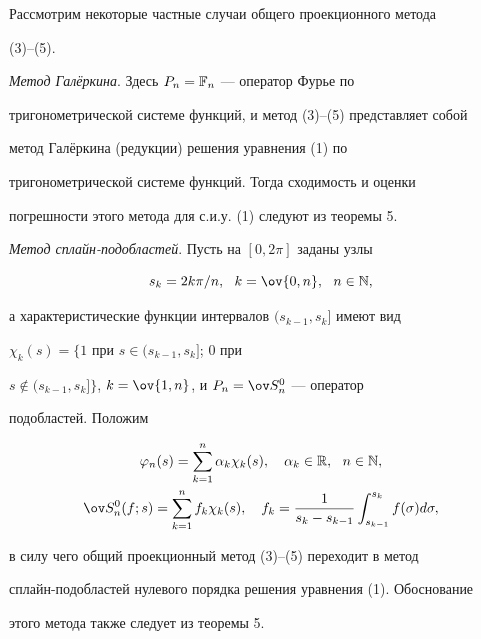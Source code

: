 Рассмотрим некоторые частные случаи общего проекционного метода 


(3)--(5).





{\it Метод Гал\"еркина}. Здесь $P_n=\Bbb F_n$ --- оператор Фурье по 


тригонометрической системе функций, и метод (3)--(5) представляет собой 


метод Гал\"еркина (редукции) решения уравнения (1) по 


тригонометрической системе функций. Тогда сходимость и оценки 


погрешности этого метода для с.и.у. (1) следуют из теоремы 5.





{\it Метод сплайн-подобластей}. Пусть на $[0,2\pi]$ заданы узлы


$$


s_k=2k\pi/n,\ \ k=\ov{0,n},\ \ n\in\Bbb N,


$$


а характеристические функции интервалов $(s_{k-1},s_k]$ имеют вид 


$\chi_k(s)=\{1$ при $s\in(s_{k-1},s_k]$; $0$ при 


$s\notin(s_{k-1},s_k]\}$, $k=\ov{1,n}$, и $P_n=\ov S^0_n$ --- оператор 


подобластей. Положим


\begin{gather*}


\varphi_n(s)=\sum^n_{k=1}\alpha_k\chi_k(s),\quad


\alpha_k\in\Bbb R,\ \ n\in\Bbb N, \\


\ov S^0_n(f;s)=\sum^n_{k=1}f_k\chi_k(s),\quad


f_k=\frac{1}{s_k-s_{k-1}}\int^{s_k}_{s_{k-1}}f(\sigma)d\sigma,


\end{gather*}


в силу чего общий проекционный метод (3)--(5) переходит в метод 


сплайн-подобластей нулевого порядка решения уравнения (1). Обоснование 


этого метода также следует из теоремы 5.





